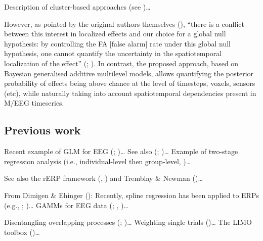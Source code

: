 \documentclass[
  doc,
  floatsintext,
  longtable,
  a4paper,
  nolmodern,
  notxfonts,
  notimes,
  colorlinks=true,linkcolor=blue,citecolor=blue,urlcolor=blue]{apa7}
\begin{document}
Description of cluster-based approaches (see
)\ldots{}

However, as pointed by the original authors themselves
(), ``there is a
conflict between this interest in localized effects and our choice for a
global null hypothesis: by controlling the FA {[}false alarm{]} rate
under this global null hypothesis, one cannot quantify the uncertainty
in the spatiotemporal localization of the effect''
(;
). In
contrast, the proposed approach, based on Bayesian generalised additive
multilevel models, allows quantifying the posterior probability of
effects being above chance at the level of timesteps, voxels, sensors
(etc), while naturally taking into account spatiotemporal dependencies
present in M/EEG timeseries.

\subsection{Previous work}\label{previous-work}

Recent example of GLM for EEG (; )\ldots{} See also (;
)\ldots{} Example of
two-stage regression analysis (i.e., individual-level then group-level,
)\ldots{}

See also the rERP framework (, ) and Tremblay \& Newman
()\ldots{}

From Dimigen \& Ehinger (): Recently,
spline regression has been applied to ERPs (e.g.,
;
)\ldots{} GAMMs
for EEG data (;
,
)\ldots{}

Disentangling overlapping processes
(;
)\ldots{}
Weighting single trials ()\ldots{} The LIMO toolbox ()\ldots{}
\end{document}
